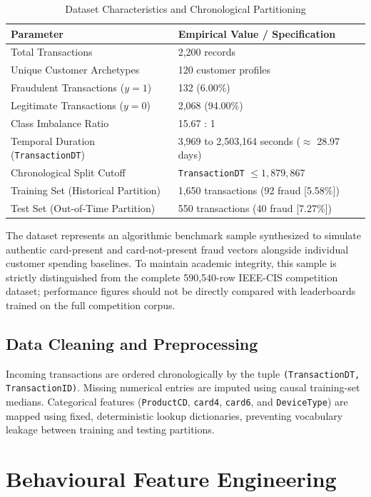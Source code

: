 \documentclass[conference]{IEEEtran}
\begin{document}
\begin{table}[t]
\centering
\caption{Dataset Characteristics and Chronological Partitioning}
\label{tab:dataset_spec}
\small
\begin{tabular}{ll}
\toprule
\textbf{Parameter} & \textbf{Empirical Value / Specification} \\
\midrule
Total Transactions & 2,200 records \\
Unique Customer Archetypes & 120 customer profiles \\
Fraudulent Transactions ($y=1$) & 132 (6.00\%) \\
Legitimate Transactions ($y=0$) & 2,068 (94.00\%) \\
Class Imbalance Ratio & 15.67 : 1 \\
Temporal Duration (\texttt{TransactionDT}) & 3,969 to 2,503,164 seconds ($\approx$ 28.97 days) \\
Chronological Split Cutoff & \texttt{TransactionDT} $\le 1,879,867$ \\
Training Set (Historical Partition) & 1,650 transactions (92 fraud [5.58\%]) \\
Test Set (Out-of-Time Partition) & 550 transactions (40 fraud [7.27\%]) \\
\bottomrule
\end{tabular}
\end{table}

The dataset represents an algorithmic benchmark sample synthesized to simulate authentic card-present and card-not-present fraud vectors alongside individual customer spending baselines. To maintain academic integrity, this sample is strictly distinguished from the complete 590,540-row IEEE-CIS competition dataset; performance figures should not be directly compared with leaderboards trained on the full competition corpus.

\subsection{Data Cleaning and Preprocessing}
Incoming transactions are ordered chronologically by the tuple \texttt{(TransactionDT, TransactionID)}. Missing numerical entries are imputed using causal training-set medians. Categorical features (\texttt{ProductCD}, \texttt{card4}, \texttt{card6}, and \texttt{DeviceType}) are mapped using fixed, deterministic lookup dictionaries, preventing vocabulary leakage between training and testing partitions.

\section{Behavioural Feature Engineering}
\end{document}
